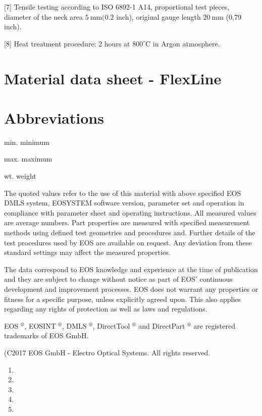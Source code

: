 \documentclass[10pt]{article}
\begin{document}
[7] Tensile testing according to ISO 6892-1 A14, proportional test pieces, diameter of the neck area $5 \mathrm{~mm}(0.2$ inch), original gauge length $20 \mathrm{~mm}$ (0,79 inch).

[8] Heat treatment procedure: 2 hours at $800^{\circ} \mathrm{C}$ in Argon atmosphere.

\section*{Material data sheet - FlexLine}
\section*{Abbreviations}
min. minimum

max. maximum

wt. weight

The quoted values refer to the use of this material with above specified EOS DMLS system, EOSYSTEM software version, parameter set and operation in compliance with parameter sheet and operating instructions. All measured values are average numbers. Part properties are measured with specified measurement methods using defined test geometries and procedures and. Further details of the test procedures used by EOS are available on request. Any deviation from these standard settings may affect the measured properties.

The data correspond to EOS knowledge and experience at the time of publication and they are subject to change without notice as part of EOS' continuous development and improvement processes. EOS does not warrant any properties or fitness for a specific purpose, unless explicitly agreed upon. This also applies regarding any rights of protection as well as laws and regulations.

EOS $^{\circledR}$, EOSINT $^{\circledR}$, DMLS $^{\circledR}$, DirectTool $^{\circledR}$ and DirectPart ${ }^{\circledR}$ are registered trademarks of EOS $\mathrm{GmbH}$.

(C2017 EOS GmbH - Electro Optical Systems. All rights reserved.

\begin{enumerate}
  \item 
  \item 
  \item 
  \item 
  \item 
\end{enumerate}
\end{document}
